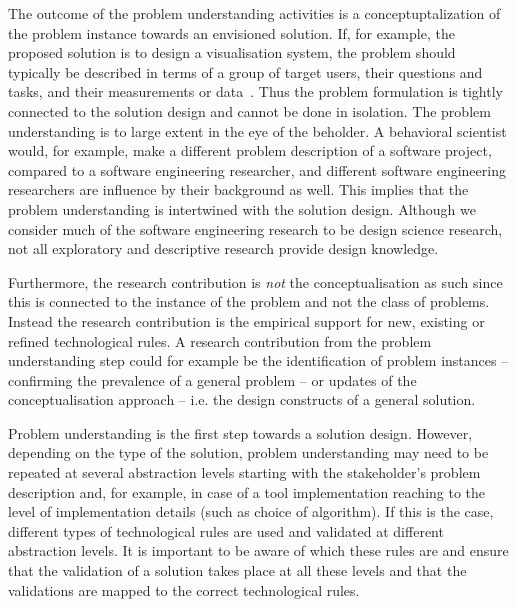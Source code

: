 \documentclass[graybox]{svmult}
\begin{document}

The outcome of the problem understanding activities is a conceptuptalization of the problem instance towards an envisioned solution. If, for example, the proposed solution is to design a visualisation system, the problem should typically be described in terms of a group of target users, their questions and tasks, and their measurements or data~\cite{meyer_nested_2015}. Thus the problem formulation is tightly connected to the solution design and cannot be done in isolation. The problem understanding is to large extent in the eye of the beholder. A behavioral scientist would, for example,  make a different problem description of a software project, compared to a software engineering researcher, and different software engineering researchers are influence by their background as well. This implies that the problem understanding is intertwined with the solution design.
Although we consider much of the software engineering research to be design science research, not all exploratory and descriptive research provide design knowledge.


Furthermore, the research contribution is \emph{not} the conceptualisation as such since this is connected to the instance of the problem and not the class of problems. Instead the research contribution is the empirical support for new, existing or refined technological rules. A research contribution from the problem understanding step could for example be the identification of problem instances -- confirming the prevalence of a general problem -- or updates of the conceptualisation approach -- i.e. the design constructs of a general solution.


Problem understanding is the first step towards a solution design. However, depending on the type of the solution, problem understanding may need to be repeated at several abstraction levels starting with the stakeholder's problem description and, for example, in case of a tool implementation reaching to the level of implementation details (such as  choice of algorithm). If this is the case, different types of technological rules are used and validated at different abstraction levels. It is important to be aware of which these rules are and ensure that the validation of a solution takes place at all these levels and that the validations are mapped to the correct technological rules. 
\end{document}
